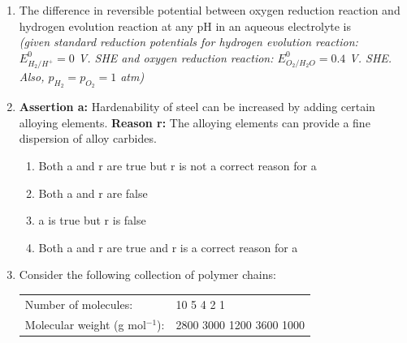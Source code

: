 \documentclass[journal,12pt,onecolumn]{IEEEtran}
\theoremstyle{remark}
\begin{document}
\begin{enumerate}
    \item The difference in reversible potential between oxygen reduction reaction and hydrogen evolution reaction at any pH in an aqueous electrolyte is\\
    \textit{(given standard reduction potentials for hydrogen evolution reaction: $ E^0_{H_2/H^+} = 0$ V. SHE and oxygen reduction reaction: $E^0_{O_2/H_2O}=0.4$ V. SHE. Also, $p_{H_2} = p_{O_2} = 1$ atm)}
    \hfill{}
    \begin{enumerate}[label=(\Alph*)]
    \end{enumerate}

    \item \textbf{Assertion a:} Hardenability of steel can be increased by adding certain alloying elements.
    \textbf{Reason r:} The alloying elements can provide a fine dispersion of alloy carbides.
    \hfill{}
    \begin{enumerate}[label=(\Alph*)]
    \item Both a and r are true but r is not a correct reason for a
    \item Both a and r are false
    \item a is true but r is false
    \item Both a and r are true and r is a correct reason for a
    \end{enumerate}

    \item Consider the following collection of polymer chains:

    \begin{tabular}{ll}
    Number of molecules: & 10 \hspace{3mm} 5 \hspace{3mm} 4 \hspace{3mm} 2 \hspace{3mm} 1 \\
    Molecular weight (g mol$^{-1}$): & 2800 \hspace{2mm} 3000 \hspace{2mm} 1200 \hspace{2mm} 3600 \hspace{2mm} 1000
    \end{tabular}


\end{enumerate}
\end{document}
